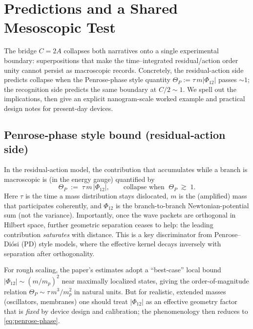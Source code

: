 \documentclass[11pt,letterpaper]{article}
\begin{document}
\section{Predictions and a Shared Mesoscopic Test}
\label{sec:predictions-test}

The bridge $C=2A$ collapses both narratives onto a single experimental boundary: superpositions that make the time–integrated residual/action order unity cannot persist as macroscopic records. Concretely, the residual-action side predicts collapse when the Penrose-phase style quantity $\Theta_{P}:=\tau\,m\lvert \Phi_{12}\rvert$ passes $\sim 1$; the recognition side predicts the same boundary at $C/2\sim 1$. We spell out the implications, then give an explicit nanogram-scale worked example and practical design notes for present-day devices. 

\subsection{Penrose‑phase style bound (residual‑action side)}

In the residual-action model, the contribution that accumulates while a branch is macroscopic is (in the energy gauge) quantified by
\begin{equation}
\Theta_{P}\;:=\;\tau\,m\,\lvert \Phi_{12}\rvert,
\qquad\text{collapse when }\;\Theta_{P}\;\gtrsim\;1.
\label{eq:penrose-phase}
\end{equation}
Here $\tau$ is the time a mass distribution stays dislocated, $m$ is the (amplified) mass that participates coherently, and $\Phi_{12}$ is the branch-to-branch Newtonian-potential sum (not the variance). Importantly, once the wave packets are orthogonal in Hilbert space, further geometric separation ceases to help: the leading contribution \emph{saturates} with distance. This is a key discriminator from Penrose–Diósi (PD) style models, where the effective kernel decays inversely with separation after orthogonality. %

For rough scaling, the paper’s estimates adopt a ``best-case'' local bound $\lvert \Phi_{12}\rvert\sim (m/m_p)^2$ near maximally localized states, giving the order-of-magnitude relation $\Theta_{P}\sim \tau\,m^3/m_p^2$ in natural units. But for realistic, extended masses (oscillators, membranes) one should treat $\lvert \Phi_{12}\rvert$ as an effective geometry factor that is \emph{fixed} by device design and calibration; the phenomenology then reduces to \eqref{eq:penrose-phase}. %
\end{document}
